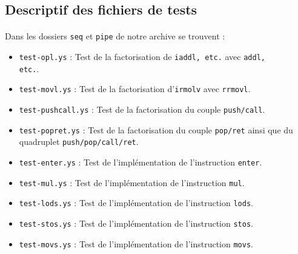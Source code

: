 \documentclass[12pt]{article}
\begin{document}
\subsection{Descriptif des fichiers de tests}
\paragraph{}Dans les dossiers \verb+seq+ et \verb+pipe+ de notre archive se trouvent :
\begin{itemize}
\item \verb+test-opl.ys+ : Test de la factorisation de \verb+iaddl, etc.+ avec \verb+addl,+ \\\verb+etc.+.
\item \verb+test-movl.ys+ : Test de la factorisation d'\verb+irmolv+ avec \verb+rrmovl+.
\item \verb+test-pushcall.ys+ : Test de la factorisation du couple \verb+push/call+.
\item \verb+test-popret.ys+ : Test de la factorisation du couple \verb+pop/ret+ ainsi que du quadruplet \verb+push/pop/call/ret+.
\item \verb+test-enter.ys+ : Test de l'implémentation de l'instruction \verb+enter+.
\item \verb+test-mul.ys+ : Test de l'implémentation de l'instruction \verb+mul+.
\item \verb+test-lods.ys+ : Test de l'implémentation de l'instruction \verb+lods+.
\item \verb+test-stos.ys+ : Test de l'implémentation de l'instruction \verb+stos+.
\item \verb+test-movs.ys+ : Test de l'implémentation de l'instruction \verb+movs+.
\end{itemize}
\end{document}
